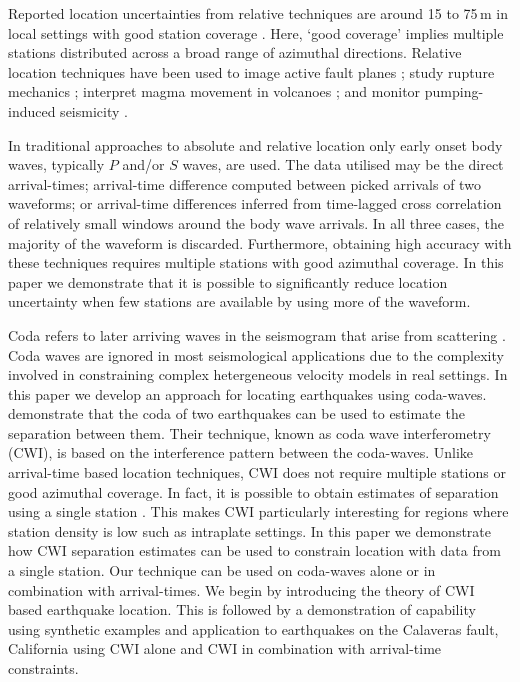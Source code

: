 \documentclass[12pt,double]{article}
\begin{document}
Reported location uncertainties from relative techniques are around
15 to 75\,m in local settings with good station coverage
\citep{dr_Ito85a, dr_Got94a, dr_Waldhauser99a,dr_Waldhauser08a}.
Here, `good coverage' implies multiple stations distributed across a
broad range of azimuthal directions. Relative location techniques
have been used to image active fault planes \citep{dr_Deichmann92a,
dr_Got94a, dr_Waldhauser99a, dr_Waldhauser02a, dr_Shearer05a}; study
rupture mechanics \citep{dr_Rubin99a, dr_Rubin02a}; interpret magma
movement in volcanoes \citep{dr_Fremont87a}; and monitor
pumping-induced seismicity \citep{dr_Lees98a, dr_Ake05a}.

In traditional approaches to absolute and relative location only
early onset body waves, typically $P$ and/or $S$ waves, are used. The
data utilised may be the direct arrival-times; arrival-time
difference computed between picked arrivals of two waveforms; or
arrival-time differences inferred from time-lagged cross correlation of
relatively small windows around the body wave arrivals.
 In all three cases, the majority of the
waveform is discarded. Furthermore, obtaining high accuracy with these techniques
requires multiple stations with good azimuthal coverage.
In this paper we demonstrate that it is possible to
significantly reduce location uncertainty when few stations are
available by using more of the waveform.

Coda refers to  later arriving waves in the seismogram that arise
from scattering  \citep{dr_Aki69a,dr_Snieder99a,dr_Snieder06a}. Coda
waves are ignored in most seismological applications due to the
complexity involved in constraining complex hetergeneous velocity models
in real settings. In this paper we
develop an approach for locating earthquakes using coda-waves.
\citet{dr_Snieder05a} demonstrate that the coda of two earthquakes
can be used to estimate the separation between them. Their
technique, known as coda wave interferometry (CWI), is based on the
interference pattern between the coda-waves. Unlike arrival-time
based location techniques, CWI
 does not require multiple stations or good azimuthal coverage.
In fact, it is possible to obtain estimates of separation using a single
station \citep{dr_Robinson07b}. This makes CWI particularly interesting
for regions where station density is low such as intraplate settings. In this
paper we demonstrate how CWI separation estimates can be used to constrain
location with data from a single station.
Our technique can be used on coda-waves alone or in combination with
arrival-times. We begin by introducing the theory of CWI based earthquake location. 
This is followed by a demonstration of capability using
synthetic examples and application to earthquakes
on the Calaveras fault, California using CWI alone
and CWI in combination with arrival-time constraints.
\end{document}
